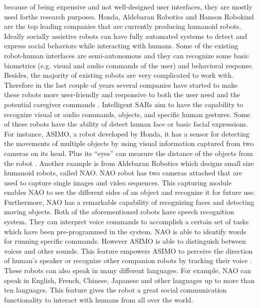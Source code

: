 because of being expensive and not well-designed user interfaces, they are mostly used forthe research purposes. Honda, Aldebaran Robotics and Hanson Robokind are the top
leading companies that are currently producing humanoid robots.
Ideally socially assistive robots can have fully automated systems to detect and
express social behaviors while interacting with humans. Some of the existing robot-human
interfaces are semi-autonomous and they can recognize some basic biometrics (e.g. visual
and audio commands of the user) and behavioral response. Besides, the majority of existing
robots are very complicated to work with. Therefore in the last couple of years several
companies have started to make these robots more user-friendly and responsive to both the
user need and the potential caregiver commands \cite{DefineSocial2005}.
Intelligent SARs aim to have the capability to recognize visual or audio commands,
objects, and specific human gestures. Some of these robots have the ability of detect human
face or basic facial expressions. For instance, ASIMO, a robot developed by Honda, it has
a sensor for detecting the movements of multiple objects by using visual information
captured from two cameras on its head. Plus its “eyes” can measure the distance of the
objects from the robot \cite{ASIMO2011}. Another example is from Aldebaran Robotics which designs
small size humanoid robots, called NAO. NAO robot has two cameras attached that are
used to capture single images and video sequences. This capturing module enables NAO
to see the different sides of an object and recognize it for future use. Furthermore, NAO
has a remarkable capability of recognizing faces and detecting moving objects.
Both of the aforementioned robots have speech recognition system. They can interpret
voice commands to accomplish a certain set of tasks which have been pre-programmed in
the system. NAO is able to identify words for running specific commands. However
ASIMO is able to distinguish between voices and other sounds. This feature empowers
ASIMO to perceive the direction of human’s speaker or recognize other companion robots
by tracking their voice \cite{DSMIV2000}. These robots can also speak in many different languages. For
example, NAO can speak in English, French, Chinese, Japanese and other languages up to
more than ten languages. This feature gives the robot a great social communication
functionality to interact with humans from all over the world.

